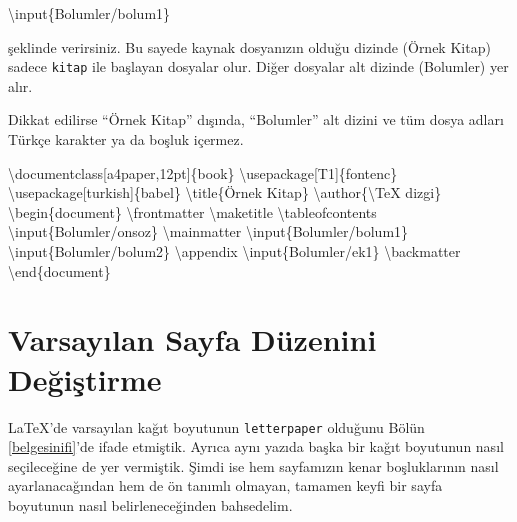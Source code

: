 \documentclass[
  10pt,
]{scrbook}
\newenvironment{Shaded}{\begin{snugshade}}{\end{snugshade}}
\newcommand{\NormalTok}[1]{#1}
\newcommand{\SpecialCharTok}[1]{\textcolor[rgb]{0.00,0.00,0.00}{#1}}
\begin{document}
\begin{Shaded}
\begin{Highlighting}[]
\NormalTok{\textbackslash{}input\{Bolumler}\SpecialCharTok{/}\NormalTok{bolum1\}}
\end{Highlighting}
\end{Shaded}

şeklinde verirsiniz. Bu sayede kaynak dosyanızın olduğu dizinde (Örnek
Kitap) sadece \texttt{kitap} ile başlayan dosyalar olur. Diğer dosyalar alt
dizinde (Bolumler) yer alır.

Dikkat edilirse ``Örnek Kitap'' dışında, ``Bolumler'' alt dizini ve tüm
dosya adları Türkçe karakter ya da boşluk içermez.

\begin{Shaded}
\begin{Highlighting}[]
\NormalTok{\textbackslash{}documentclass[a4paper,12pt]\{book\}}
\NormalTok{\textbackslash{}usepackage[T1]\{fontenc\}}
\NormalTok{\textbackslash{}usepackage[turkish]\{babel\}}
\NormalTok{\textbackslash{}title\{Örnek Kitap\}}
\NormalTok{\textbackslash{}author\{\textbackslash{}TeX dizgi\}}
\NormalTok{\textbackslash{}begin\{document\}}
\NormalTok{\textbackslash{}frontmatter}
\NormalTok{\textbackslash{}maketitle}
\NormalTok{\textbackslash{}tableofcontents}
\NormalTok{\textbackslash{}input\{Bolumler}\SpecialCharTok{/}\NormalTok{onsoz\}}
\NormalTok{\textbackslash{}mainmatter}
\NormalTok{\textbackslash{}input\{Bolumler}\SpecialCharTok{/}\NormalTok{bolum1\}}
\NormalTok{\textbackslash{}input\{Bolumler}\SpecialCharTok{/}\NormalTok{bolum2\}}
\NormalTok{\textbackslash{}appendix}
\NormalTok{\textbackslash{}input\{Bolumler}\SpecialCharTok{/}\NormalTok{ek1\}}
\NormalTok{\textbackslash{}backmatter}
\NormalTok{\textbackslash{}end\{document\}}
\end{Highlighting}
\end{Shaded}

\hypertarget{varsayux131lan-sayfa-duxfczenini-deux11fiux15ftirme}{%
\section{Varsayılan Sayfa Düzenini Değiştirme}\label{varsayux131lan-sayfa-duxfczenini-deux11fiux15ftirme}}

LaTeX'de varsayılan kağıt boyutunun \texttt{letterpaper} olduğunu Bölün \ref{belgesinifi}'de ifade etmiştik. Ayrıca aynı yazıda başka bir kağıt boyutunun
nasıl seçileceğine de yer vermiştik. Şimdi ise hem sayfamızın kenar
boşluklarının nasıl ayarlanacağından hem de ön tanımlı olmayan, tamamen
keyfi bir sayfa boyutunun nasıl belirleneceğinden bahsedelim.
\end{document}
